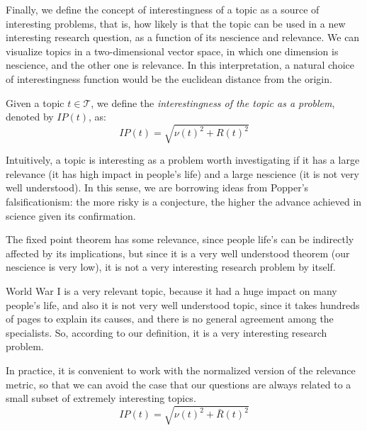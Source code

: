 Finally, we define the concept of interestingness of a topic as a source of interesting problems, that is, how likely is that the topic can be used in a new interesting research question, as a function of its nescience and relevance. We can visualize topics in a two-dimensional vector space, in which one dimension is nescience, and the other one is relevance. In this interpretation, a natural choice of interestingness function would be the euclidean distance from the origin.

\begin{definition}
Given a topic $t \in \mathcal{T}$, we define the \emph{interestingness of the topic as a problem}, denoted by $IP(t)$, as:
\[
IP(t) = \sqrt{ \nu(t)^2 +  R(t)^2 }
\]
\end{definition}

Intuitively, a topic is interesting as a problem worth investigating if it has a large relevance (it has high impact in people's life) and a large nescience (it is not very well understood). In this sense, we are borrowing ideas from Popper's falsificationism: the more risky is a conjecture, the higher the advance achieved in science given its confirmation.

\begin{example}
\label{ex:fixed_point}
The fixed point theorem has some relevance, since people life's can be indirectly affected by its implications, but since it is a very well understood theorem (our nescience is very low), it is not a very interesting research problem by itself.

World War I is a very relevant topic, because it had a huge impact on many people's life, and also it is not very well understood topic, since it takes hundreds of pages to explain its causes, and there is no general agreement among the specialists. So, according to our definition, it is a very interesting research problem.
\end{example}

In practice, it is convenient to work with the normalized version of the relevance metric, so that we can avoid the case that our questions are always related to a small subset of extremely interesting topics.
\[
IP(t) = \sqrt{ \nu(t)^2 +  \bar{R}(t)^2 }
\]


